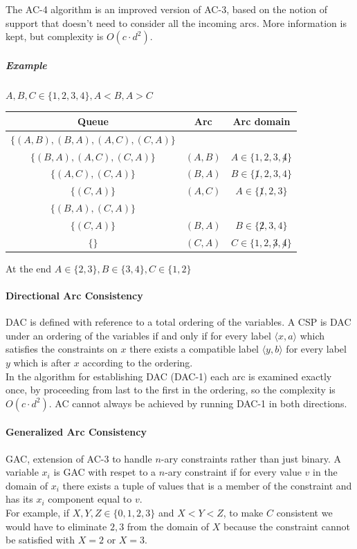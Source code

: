 \documentclass[10pt]{report}
\begin{document}
The AC-4 algorithm is an improved version of AC-3, based on the notion of support that doesn't need to consider all the incoming arcs. More information is kept, but complexity is $O(c\cdot d^2)$.
\subparagraph{Example} $A, B, C \in \{1,2,3,4\}, A < B, A > C$\\
\begin{center}
\begin{tabular}{c c c}
	Queue & Arc & Arc domain\\
	\hline
	$\{(A,B), (B, A), (A, C), (C, A)\}$ & & \\
	$\{(B, A), (A, C), (C, A)\}$ & $(A,B)$ & $A \in \{1,2,3,\not 4\}$ \\
	$\{(A,C), (C, A)\}$ & $(B, A)$ & $B \in \{\not 1, 2, 3, 4\}$\\
	$\{(C, A)\}$ & $(A, C)$ & $A \in \{\not 1, 2, 3\}$\\
	$\{(B,A), (C, A)\}$ & & \\
	$\{(C, A)\}$ & $(B, A)$ & $B \in \{\not 2, 3, 4\}$\\
	$\{\}$ & $(C, A)$ & $C \in \{1, 2, \not 3,\not 4\}$\\
\end{tabular}
\end{center}
At the end $A\in\{2,3\}, B\in\{3,4\}, C\in\{1,2\}$
\paragraph{Directional Arc Consistency} DAC is defined with reference to a total ordering of the variables. A CSP is DAC under an ordering of the variables if and only if for every label $\langle x, a\rangle$ which satisfies the constraints on $x$ there exists a compatible label $\langle y,b\rangle$ for every label $y$ which is after $x$ according to the ordering.\\
In the algorithm for establishing DAC (DAC-1) each arc is examined exactly once, by proceeding from last to the first in the ordering, so the complexity is $O(c\cdot d^2)$. AC cannot always be achieved by running DAC-1 in both directions.
\paragraph{Generalized Arc Consistency} GAC, extension of AC-3 to handle $n$-ary constraints rather than just binary. A variable $x_i$ is GAC with respet to a $n$-ary constraint if for every value $v$ in the domain of $x_i$ there exists a tuple of values that is a member of the constraint and has its $x_i$ component equal to $v$.\\
For example, if $X, Y, Z \in \{0,1,2,3\}$ and $X < Y < Z$, to make $C$ consistent we would have to eliminate $2, 3$ from the domain of $X$ because the constraint cannot be satisfied with $X=2$ or $X=3$.
\end{document}
